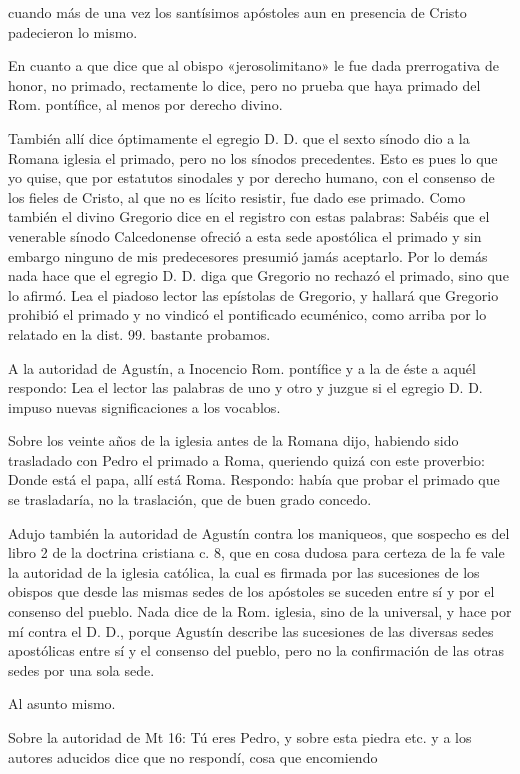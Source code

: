 cuando más de una vez los santísimos apóstoles aun en presencia de Cristo padecieron lo mismo.

En cuanto a que dice que al obispo «jerosolimitano» le fue dada prerrogativa de honor, no primado, rectamente lo dice, pero no prueba que haya primado del Rom. pontífice, al menos por derecho divino.

También allí dice óptimamente el egregio D. D. que el sexto sínodo dio a la Romana iglesia el primado, pero no los sínodos precedentes. Esto es pues lo que yo quise, que por estatutos sinodales y por derecho humano, con el consenso de los fieles de Cristo, al que no es lícito resistir, fue dado ese primado. Como también el divino Gregorio dice en el registro con estas palabras: Sabéis que el venerable sínodo Calcedonense ofreció a esta sede apostólica el primado y sin embargo ninguno de mis predecesores presumió jamás aceptarlo. Por lo demás nada hace que el egregio D. D. diga que Gregorio no rechazó el primado, sino que lo afirmó. Lea el piadoso lector las epístolas de Gregorio, y hallará que Gregorio prohibió el primado y no vindicó el pontificado ecuménico, como arriba por lo relatado en la dist. 99. bastante probamos.

A la autoridad de Agustín, a Inocencio Rom. pontífice y a la de éste a aquél respondo: Lea el lector las palabras de uno y otro y juzgue si el egregio D. D. impuso nuevas significaciones a los vocablos.

Sobre los veinte años de la iglesia antes de la Romana dijo, habiendo sido trasladado con Pedro el primado a Roma, queriendo quizá con este proverbio: Donde está el papa, allí está Roma. Respondo: había que probar el primado que se trasladaría, no la traslación, que de buen grado concedo.

Adujo también la autoridad de Agustín contra los maniqueos, que sospecho es del libro 2 de la doctrina cristiana c. 8, que en cosa dudosa para certeza de la fe vale la autoridad de la iglesia católica, la cual es firmada por las sucesiones de los obispos que desde las mismas sedes de los apóstoles se suceden entre sí y por el consenso del pueblo. Nada dice de la Rom. iglesia, sino de la universal, y hace por mí contra el D. D., porque Agustín describe las sucesiones de las diversas sedes apostólicas entre sí y el consenso del pueblo, pero no la confirmación de las otras sedes por una sola sede.

Al asunto mismo.

\marginpar{\small[301]} Sobre la autoridad de Mt 16: Tú eres Pedro, y sobre esta piedra etc. y a los autores aducidos dice que no respondí, cosa que encomiendo

